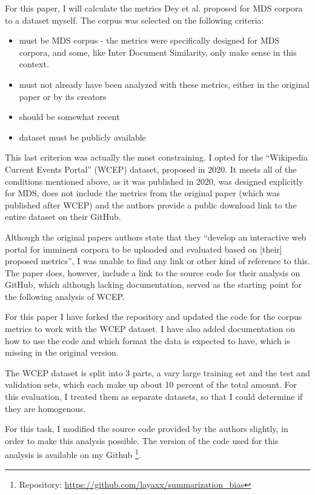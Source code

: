 \documentclass[../main.tex]{subfiles}
\begin{document}
For this paper, I will calculate the metrics Dey et al. proposed for MDS corpora to a dataset myself.
The corpus was selected on the following criteria:

\begin{itemize}
    \item must be MDS corpus - the metrics were specifically designed for MDS corpora, and some, like Inter Document Similarity, only make sense in this context.
    \item must not already have been analyzed with these metrics, either in the original paper or by its creators
    \item should be somewhat recent
    \item dataset must be publicly available
\end{itemize}

This last criterion was actually the most constraining. I opted for the \enquote{Wikipedia Current Events Portal} (WCEP) dataset, proposed in 2020. \cite{WCEP-gholipour-ghalandari-etal-2020-large}
It meets all of the conditions mentioned above, as it was published in 2020, was designed explicitly for MDS, does not include the metrics from the original paper (which was published after WCEP) and the authors provide a public download link to the entire dataset on their GitHub.\cite{WCEP-Github-complementizer_2022}


Although the original papers authors state that they \enquote{develop an interactive web portal for imminent corpora to be uploaded and evaluated based
    on [their] proposed metrics}, I was unable to find any link or other kind of reference to this.
The paper does, however, include a link to the source code for their analysis on GitHub, which although lacking documentation, served as the starting point for the following analysis of WCEP.

For this paper I have forked the repository and updated the code for the corpus metrics to work with the WCEP dataset.
I have also added documentation on how to use the code and which format the data is expected to have, which is missing in the original version.


The WCEP dataset is split into 3 parts, a vary large training set and the test and validation sets, which each make up about 10 percent of the total amount.
For this evaluation, I treated them as separate datasets, so that I could determine if they are homogenous.

For this task, I modified the source code provided by the authors slightly, in order to make this analysis possible. The version of the code used for this analysis is available on my Github \footnote{Repository: \url{https://github.com/layaxx/summarization_bias}}.
\end{document}
